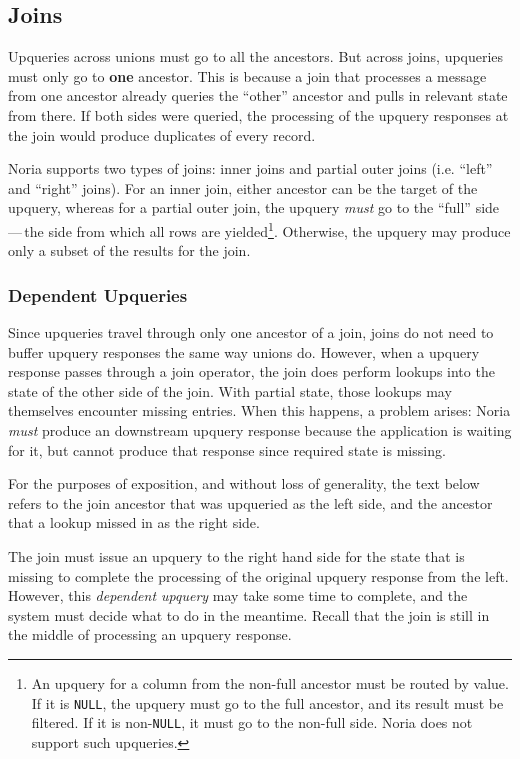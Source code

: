 \subsection{Joins}

Upqueries across unions must go to all the ancestors. But across joins,
upqueries must only go to \textbf{one} ancestor. This is because a join that
processes a message from one ancestor already queries the ``other'' ancestor and
pulls in relevant state from there. If both sides were queried, the processing
of the upquery responses at the join would produce duplicates of every record.

Noria supports two types of joins: inner joins and partial outer joins (i.e.
``left'' and ``right'' joins). For an inner join, either ancestor can be the
target of the upquery, whereas for a partial outer join, the upquery \emph{must}
go to the ``full'' side\,---\,the side from which all rows are
yielded\footnote{An upquery for a column from the non-full ancestor must be
routed by value. If it is \texttt{NULL}, the upquery must go to the full
ancestor, and its result must be filtered. If it is non-\texttt{NULL}, it must
go to the non-full side. Noria does not support such upqueries.}. Otherwise, the
upquery may produce only a subset of the results for the join.

\subsubsection{Dependent Upqueries}

Since upqueries travel through only one ancestor of a join, joins do not need to
buffer upquery responses the same way unions do. However, when a upquery
response passes through a join operator, the join does perform lookups into the
state of the other side of the join. With partial state, those lookups may
themselves encounter missing entries. When this happens, a problem arises: Noria
\emph{must} produce an downstream upquery response because the application is
waiting for it, but cannot produce that response since required state is
missing.

For the purposes of exposition, and without loss of generality, the text below
refers to the join ancestor that was upqueried as the left side, and the
ancestor that a lookup missed in as the right side.

The join must issue an upquery to the right hand side for the state that is
missing to complete the processing of the original upquery response from the
left. However, this \textit{dependent upquery} may take some time to complete,
and the system must decide what to do in the meantime. Recall that the join is
still in the middle of processing an upquery response.

